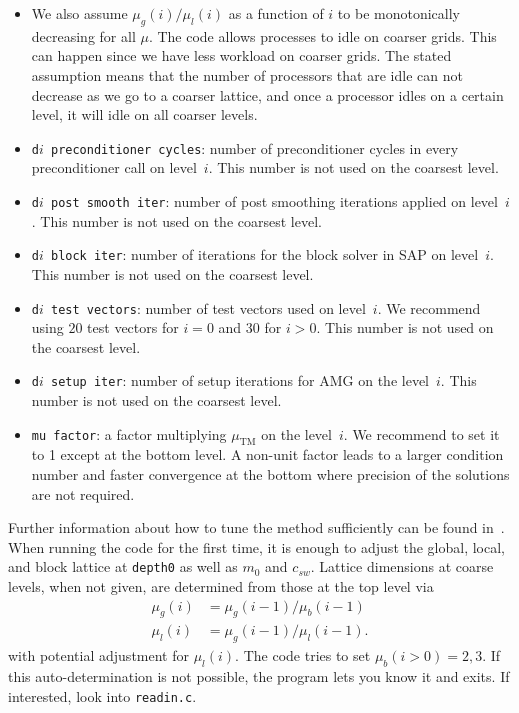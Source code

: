 \documentclass[a4paper,12pt]{scrartcl}
\begin{document}
\begin{itemize}
\begin{itemize}
    \item We also assume $\mu_g(i)/\mu_l(i)$ as a function of $i$ to be monotonically decreasing for all $\mu$. The code allows processes to idle on coarser grids. This can happen since we have less workload on coarser grids. The stated assumption means that the number of processors that are idle can not decrease as we go to a coarser lattice, and once a processor idles on a certain level, it will idle on all coarser levels.    
    \item \texttt{d$i$ preconditioner cycles}: number of preconditioner cycles in every preconditioner call on level~$i$.  This number is not used on the coarsest level.
    \item \texttt{d$i$ post smooth iter}: number of post smoothing iterations applied on level~$i$.  This number is not used on the coarsest level.
    \item \texttt{d$i$ block iter}: number of iterations for the block solver in SAP on level~$i$.  This number is not used on the coarsest level.
    \item \texttt{d$i$ test vectors}: number of test vectors used on level~$i$. We recommend using $20$ test vectors for $i=0$ and $30$ for $i>0$.  This number is not used on the coarsest level.
    \item \texttt{d$i$ setup iter}: number of setup iterations for AMG on the level~$i$.  This number is not used on the coarsest level.
    \item \texttt{mu factor}: a factor multiplying $\mu_\mathrm{TM}$ on the level~$i$.  We recommend to set it to 1 except at the bottom level.  A non-unit factor leads to a larger condition number and faster convergence at the bottom where precision of the solutions are not required.
  \end{itemize}
\end{itemize}
Further information about how to tune the method sufficiently can be found in~\cite{Frommer:2013kla,FroKaKrLeRo13,RottmannPhD,Alexandrou:2016izb}. When running the code for the first time, it is enough to adjust the global, local, and block lattice at \texttt{depth0} as well as $m_0$ and $c_{sw}$.  Lattice dimensions at coarse levels, when not given, are determined from those at the top level via
\begin{align*}
\mu_g(i) &= \mu_g(i-1)/\mu_b(i-1)\\
\mu_l(i) &= \mu_g(i-1)/\mu_l(i-1).
\end{align*}
with potential adjustment for $\mu_l(i)$.  The code tries to set $\mu_b(i>0) = 2,3$.  If this auto-determination is not possible, the program lets you know it and exits.  If interested, look into \texttt{readin.c}.
\end{document}
